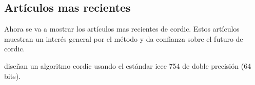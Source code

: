 \begin{table}[]
	\centering
	\caption{Tabla de comparaciones del \gls{cordic} propuesto con otros trabajos parecidos. Tabla de \cite{nguyen_low-resource_2015}}
\label{graf:2015_low-latency-fp}
\end{table}


\subsection{Artículos mas recientes}
Ahora se va a mostrar los artículos mas recientes de \gls{cordic}. Estos artículos muestran un interés general por el método y da confianza sobre el futuro de \gls{cordic}.

\cite{hou_low_2019} diseñan un algoritmo \gls{cordic} usando el estándar \gls{ieee} 754 de doble precisión (64 bits).

